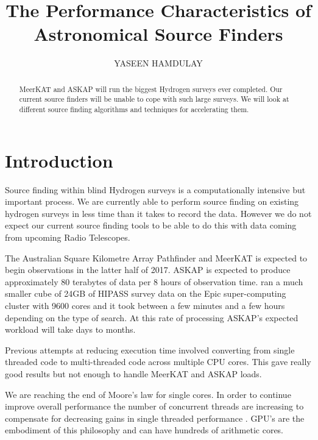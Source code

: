 \documentclass[prodmode,acmtecs]{acmsmall} \usepackage[ruled]{algorithm2e}
\begin{document}
\title{The Performance Characteristics of Astronomical Source Finders}
\author{YASEEN HAMDULAY
}

\begin{abstract}
MeerKAT and ASKAP will run the biggest Hydrogen surveys ever completed. Our current source
finders will be unable to cope with such large surveys. We will look at different source
finding algorithms and techniques for accelerating them.
\end{abstract}



\maketitle

\section{Introduction}
Source finding within blind Hydrogen surveys is a computationally intensive but important process.
We are currently able to perform source finding on existing hydrogen surveys in less time than it takes
to record the data. However we do not expect our current source finding tools to be able to do this with
data coming from upcoming Radio Telescopes. 

The Australian Square Kilometre Array Pathfinder and MeerKAT is expected to begin observations in the latter
half of 2017. ASKAP is expected to produce approximately 80 terabytes of data per 8 hours of 
observation time. \cite{whiting2012source} ran a much smaller cube of 24GB of HIPASS \cite{wong2006northern}
 survey data on the Epic super-computing
cluster with 9600 cores and it took between a few minutes and a few hours depending on the
type of search. At this rate of processing ASKAP's expected workload will take days to months. 

Previous attempts at reducing execution time involved converting from single threaded code
to multi-threaded code across multiple CPU cores. \cite{scott} This gave really good results
but not enough to handle MeerKAT and ASKAP loads.

We are reaching the end of Moore's law for single cores. In order to continue improve overall performance
the number of concurrent threads are increasing to compensate for decreasing gains in single
threaded performance \cite{michalakes2008gpu}. GPU's are the embodiment of this philosophy
and can have hundreds of arithmetic cores. 
\end{document}

